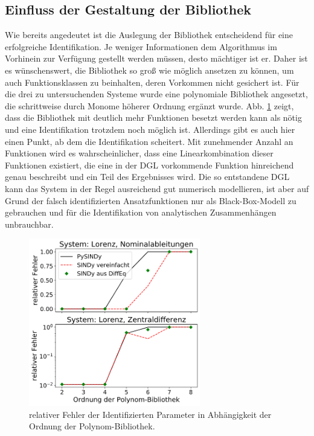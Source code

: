 \subsection{Einfluss der Gestaltung der Bibliothek}
Wie bereits angedeutet ist die Auslegung der Bibliothek entscheidend für eine erfolgreiche Identifikation. Je weniger Informationen dem Algorithmus im Vorhinein zur Verfügung gestellt werden müssen, desto mächtiger ist er. Daher ist es wünschenswert, die Bibliothek so groß wie möglich ansetzen zu können, um auch Funktionsklassen zu beinhalten, deren Vorkommen nicht gesichert ist. Für die drei zu untersuchenden Systeme wurde eine polynomiale Bibliothek angesetzt, die schrittweise durch Monome höherer Ordnung ergänzt wurde. Abb. \ref{fig:errors_order} zeigt, dass die Bibliothek mit deutlich mehr Funktionen besetzt werden kann als nötig und eine Identifikation trotzdem noch möglich ist. Allerdings gibt es auch hier einen Punkt, ab dem die Identifikation scheitert. Mit zunehmender Anzahl an Funktionen wird es wahrscheinlicher, dass eine Linearkombination dieser Funktionen existiert, die eine in der DGL vorkommende Funktion hinreichend genau beschreibt und ein Teil des Ergebnisses wird. Die so entstandene DGL kann das System in der Regel ausreichend gut numerisch modellieren, ist aber auf Grund der falsch identifizierten Ansatzfunktionen nur als Black-Box-Modell zu gebrauchen und für die Identifikation von analytischen Zusammenhängen unbrauchbar.

\begin{figure}[h!] %
	\centering
	\includegraphics[width=75mm]{images/errors_Lorenz_order_variation.png}
	\caption{relativer Fehler der Identifizierten Parameter in Abhängigkeit der Ordnung der Polynom-Bibliothek.}
	\label{fig:errors_order}
\end{figure}

